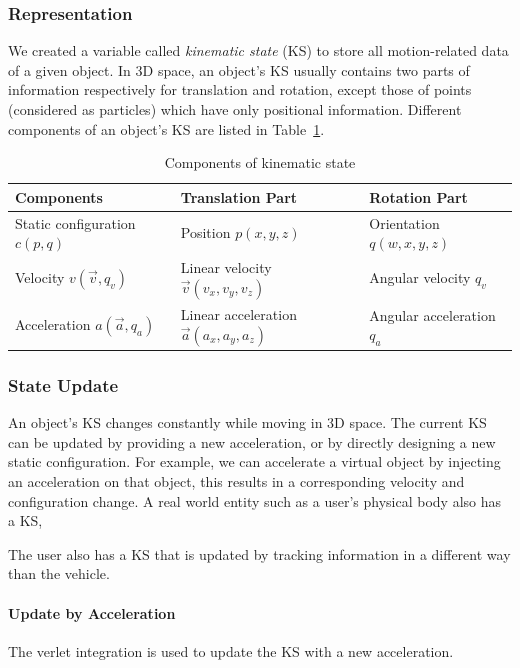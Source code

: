 \subsubsection{Representation}
We created a variable called \textit{kinematic state} (KS) to store all motion-related data of a given object. In 3D space, an object's KS usually contains two parts of information respectively for translation and rotation, except those of points (considered as particles) which have only positional information. Different components of an object's KS are listed in Table~\ref{tab:5_ks_components}.

\begin{table}[hbt]
\renewcommand{\arraystretch}{1.3}
\caption{Components of kinematic state}
\label{tab:5_ks_components}
\centering
\begin{tabular}{l l l}
  \hline
  Components & Translation Part & Rotation Part \\
  \hline
  Static configuration $c(p, q)$ & Position $p(x, y, z)$ & Orientation $q(w, x, y, z)$ \\
  Velocity $v(\overrightarrow{v}, q_{v})$ & Linear velocity $\overrightarrow{v}(v_{x}, v_{y}, v_{z})$ & Angular velocity $q_{v}$ \\
  Acceleration $a(\overrightarrow{a}, q_{a})$ & Linear acceleration $\overrightarrow{a}(a_{x}, a_{y}, a_{z})$ & Angular acceleration $q_{a}$ \\
  \hline
\end{tabular}
\end{table}


\subsubsection{State Update}
An object's KS changes constantly while moving in 3D space. The current KS can be updated by providing a new acceleration, or by directly designing a new static configuration. For example, we can accelerate a virtual object by injecting an acceleration on that object, this results in a corresponding velocity and configuration change. A real world entity such as a user's physical body also has a KS,

 The user also has a KS that is updated by tracking information in a different way than the vehicle.

\paragraph{Update by Acceleration}
The verlet integration is used to update the KS with a new acceleration.


